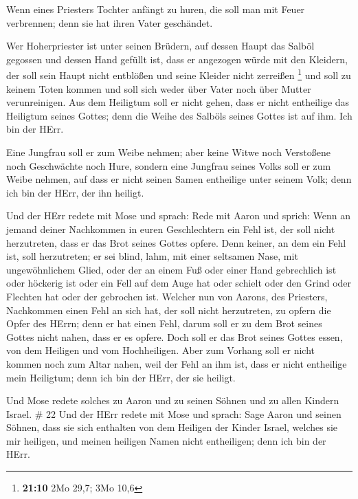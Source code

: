 Wenn eines Priesters Tochter anfängt zu huren, die soll man
mit Feuer verbrennen; denn sie hat ihren Vater geschändet.

 Wer Hoherpriester ist unter seinen Brüdern, auf dessen
Haupt das Salböl gegossen und dessen Hand gefüllt ist, dass er angezogen
würde mit den Kleidern, der soll sein Haupt nicht entblößen und seine
Kleider nicht zerreißen \footnote{\textbf{21:10} 2Mo 29,7; 3Mo 10,6}
 und soll zu keinem Toten kommen und soll sich weder über
Vater noch über Mutter verunreinigen.  Aus dem Heiligtum
soll er nicht gehen, dass er nicht entheilige das Heiligtum seines
Gottes; denn die Weihe des Salböls seines Gottes ist auf ihm. Ich bin
der HErr.

 Eine Jungfrau soll er zum Weibe nehmen;  aber
keine Witwe noch Verstoßene noch Geschwächte noch Hure, sondern eine
Jungfrau seines Volks soll er zum Weibe nehmen,  auf dass
er nicht seinen Samen entheilige unter seinem Volk; denn ich bin der
HErr, der ihn heiligt.

 Und der HErr redete mit Mose und sprach: 
Rede mit Aaron und sprich: Wenn an jemand deiner Nachkommen in euren
Geschlechtern ein Fehl ist, der soll nicht herzutreten, dass er das Brot
seines Gottes opfere.  Denn keiner, an dem ein Fehl ist,
soll herzutreten; er sei blind, lahm, mit einer seltsamen Nase, mit
ungewöhnlichem Glied,  oder der an einem Fuß oder einer
Hand gebrechlich ist  oder höckerig ist oder ein Fell auf
dem Auge hat oder schielt oder den Grind oder Flechten hat oder der
gebrochen ist.  Welcher nun von Aarons, des Priesters,
Nachkommen einen Fehl an sich hat, der soll nicht herzutreten, zu opfern
die Opfer des HErrn; denn er hat einen Fehl, darum soll er zu dem Brot
seines Gottes nicht nahen, dass er es opfere.  Doch soll er
das Brot seines Gottes essen, von dem Heiligen und vom Hochheiligen.
 Aber zum Vorhang soll er nicht kommen noch zum Altar
nahen, weil der Fehl an ihm ist, dass er nicht entheilige mein
Heiligtum; denn ich bin der HErr, der sie heiligt.

 Und Mose redete solches zu Aaron und zu seinen Söhnen und
zu allen Kindern Israel. \# 22  Und der HErr redete mit Mose
und sprach:  Sage Aaron und seinen Söhnen, dass sie sich
enthalten von dem Heiligen der Kinder Israel, welches sie mir heiligen,
und meinen heiligen Namen nicht entheiligen; denn ich bin der HErr.


